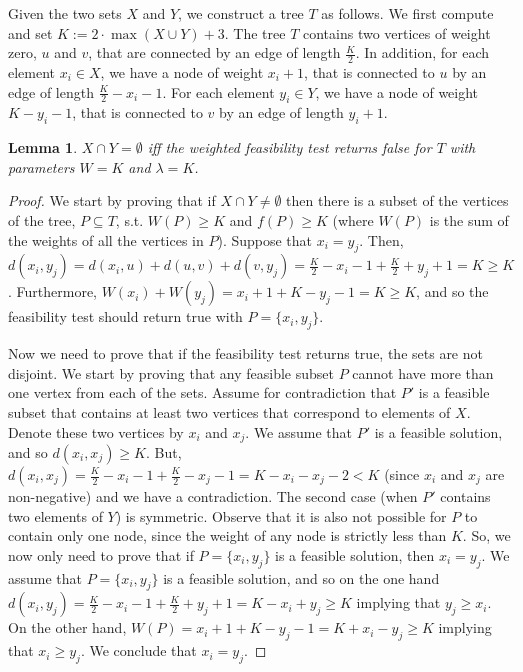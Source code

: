 \documentclass[11pt,a4paper]{article}
\newtheorem{lemma}{Lemma}
\theoremstyle{definition}
\theoremstyle{remark}
\begin{document}
Given the two sets $X$ and $Y$, we construct a tree $T$ as follows. We first compute and set
$K := 2 \cdot \max (X\cup Y) +3$.
The tree $T$ contains two vertices of weight zero, $u$ and $v$, that are connected by an edge of length $\frac{K}{2}$. In addition, for each element $x_i \in X$, we have a node of weight $x_i+1$, that is connected to $u$ by an edge of length $\frac{K}{2} - x_i -1$. For each element $y_i \in Y$, we have a node of weight $K - y_i -1$, that is connected to $v$ by an edge of length $y_i+1$.
\begin{lemma}
$X \cap Y = \emptyset$ iff the weighted feasibility test returns false for $T$ with  parameters $W=K$ and $\lambda =K$.
\end{lemma}

\begin{proof}
We start by proving that if $X \cap Y \neq \emptyset$ then there is a subset of the vertices of the tree, $P \subseteq T$, s.t. $W(P) \geq K$ and $f(P) \geq K$ (where $W(P)$ is the sum of the weights of all the vertices in $P$). Suppose that  $x_i=y_j$. Then, $d(x_i,y_j) = d(x_i,u) + d(u,v) + d(v,y_j) = \frac{K}{2} - x_i -1 + \frac{K}{2} + y_j +1 = K \geq K$. Furthermore, $W(x_i) + W(y_j) = x_i + 1 + K- y_j -1 = K \geq K$, and so the feasibility test should return true with $P = \lbrace x_i, y_j \rbrace$.

Now we need to prove that if the feasibility test returns true, the sets are not disjoint.
We start by proving that any feasible subset $P$ cannot have more than one vertex from each of the sets.
Assume for contradiction that $P'$ is a feasible subset that contains at least two vertices that correspond to elements of $X$. Denote these two vertices by $x_i$ and $x_j$. We assume that $P'$ is a feasible solution, and so $d(x_i,x_j) \geq K$. But, $d(x_i,x_j) = \frac{K}{2} - x_i -1 + \frac{K}{2} - x_j -1 = K - x_i - x_j -2 < K$ (since $x_i$ and $x_j$ are non-negative) and we have a contradiction.
The second case (when $P'$ contains two elements of $Y$) is symmetric. %
Observe that it is also not possible for $P$ to contain only one node, since the weight of any node is strictly less than $K$. So, we now only need to prove that if $P= \{ x_i,y_j \}$ is a feasible solution, then $x_i = y_j$. We assume that $P= \{ x_i,y_j \}$ is a feasible solution, and so on the one hand $d(x_i,y_j) = \frac{K}{2} - x_i -1 + \frac{K}{2} + y_j +1 = K - x_i + y_j \geq K$ implying that $y_j \geq x_i$. On the other hand, $W(P) = x_i + 1 + K - y_j -1 = K + x_i - y_j \geq K$ implying that $x_i \geq y_j$. We conclude that $x_i = y_j$.
\end{proof}
\end{document}
